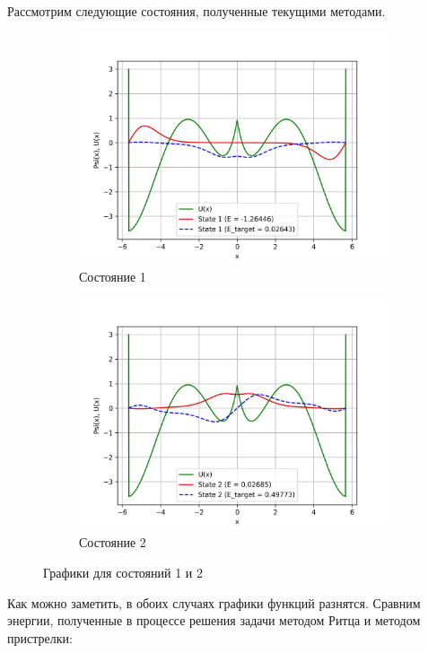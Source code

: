 Рассмотрим следующие состояния, полученные текущими методами.

\begin{figure}[H]
    \centering
    \begin{subfigure}{0.45\textwidth}
        \centering
        \includegraphics[width=0.9\linewidth]{State 1}
        \caption{Состояние 1}
        \label{fig:state1}
    \end{subfigure}%
    \begin{subfigure}{0.45\textwidth}
        \centering
        \includegraphics[width=0.9\linewidth]{State 2}
        \caption{Состояние 2}
        \label{fig:state2}
    \end{subfigure}%
\caption{Графики для состояний 1 и 2}
\end{figure}
\label{fig:state12}
Как можно заметить, в обоих случаях графики функций разнятся.
Сравним энергии, полученные в процессе решения задачи методом Ритца и методом пристрелки:
